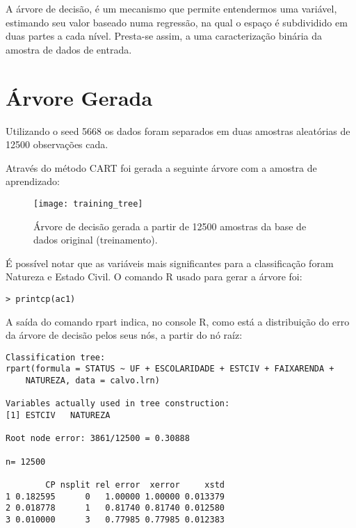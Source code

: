 \label{chap:DecisionTree}A árvore de decisão, é um mecanismo que permite entendermos uma variável,
estimando seu valor baseado numa regressão, na qual o espaço é subdividido
em duas partes a cada nível. Presta-se assim, a uma caracterização
binária da amostra de dados de entrada.


\section{Árvore Gerada}

Utilizando o seed 5668 os dados foram separados em duas amostras aleatórias
de 12500 observações cada.

Através do método CART foi gerada a seguinte árvore com a amostra
de aprendizado:

\begin{center}
\begin{figure}[h]
\begin{centering}
\texttt{[image: training\_tree]}
\par\end{centering}
\caption{\label{fig:TrainingTree}Árvore de decisão gerada a partir de 12500 amostras da base de dados original (treinamento).}
\end{figure}
\vspace*{-40pt}
\par\end{center}

É possível notar que as variáveis mais significantes para a classificação
foram Natureza e Estado Civil. O comando R usado para gerar a árvore foi:

\begin{verbatim}
> printcp(ac1)
\end{verbatim}


A saída do comando rpart indica, no console R, como está a distribuição do erro da árvore de decisão pelos seus nós, a partir do nó raíz:

\begin{lstlisting}
Classification tree:
rpart(formula = STATUS ~ UF + ESCOLARIDADE + ESTCIV + FAIXARENDA + 
    NATUREZA, data = calvo.lrn)
 
Variables actually used in tree construction:
[1] ESTCIV   NATUREZA
 
Root node error: 3861/12500 = 0.30888
 
n= 12500 
 
        CP nsplit rel error  xerror     xstd
1 0.182595      0   1.00000 1.00000 0.013379
2 0.018778      1   0.81740 0.81740 0.012580
3 0.010000      3   0.77985 0.77985 0.012383
\end{lstlisting}


